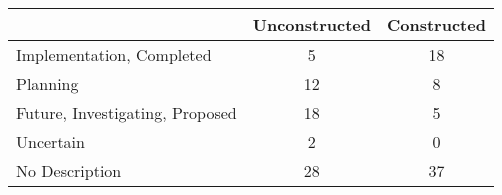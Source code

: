 \begin{tabular}{l*{1}{cc}}
 &Unconstructed &Constructed  \\
\hline 
Implementation, Completed &          5 &         18  \\
Planning &         12 &          8  \\
Future, Investigating, Proposed &         18 &          5  \\
Uncertain &          2 &          0  \\
\hline No Description &         28 &         37  \\
\hline
\end{tabular}